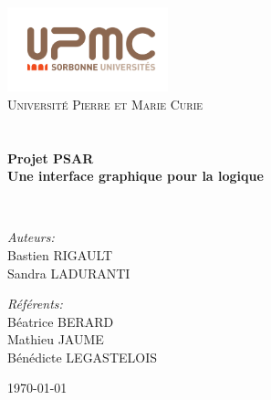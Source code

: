 \begin{titlepage}
\begin{center}

\includegraphics[width=0.35\textwidth]{./logo.png}~\\[1cm]

\textsc{\LARGE Université Pierre et Marie Curie}\\[1.5cm]

\textsc{\Large }\\[0.5cm]

\HRule \\[0.4cm]

{\huge \bfseries Projet PSAR\\
Une interface graphique pour la logique \\[0.4cm] }

\HRule \\[1.5cm]

\begin{minipage}{0.4\textwidth}
\begin{flushleft} \large
\emph{Auteurs:}\\
Bastien \textsc{RIGAULT}\\
Sandra \textsc{LADURANTI}
\end{flushleft}
\end{minipage}
\begin{minipage}{0.4\textwidth}
\begin{flushright} \large
\emph{Référents:} \\
Béatrice \textsc{BERARD}\\
Mathieu \textsc{JAUME}\\
Bénédicte \textsc{LEGASTELOIS}\\
\end{flushright}
\end{minipage}

\vfill

{\large \today}

\end{center}
\end{titlepage}